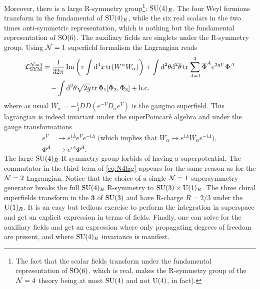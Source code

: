             Moreover, there is a large R-symmetry group\footnote{The fact that the scalar fields transform under the fundamental representation of $\text{SO}(6)$, which is real, makes the R-symmetry group of the $\mathcal{N} = 4$ theory being at most $\text{SU}(4)$ and not $\text{U}(4)$, in fact).}: $\text{SU}(4)_R$. The four Weyl fermions transform in the fundamental of $\text{SU}(4)_R$, while the six real scalars in the two times anti-symmetric representation, which is nothing but the fundamental representation of $\text{SO}(6)$. The auxiliary fields are singlets under the R-symmetry group. Using $\mathcal{N} = 1$ superfield formalism the Lagrangian reads
            \begin{align}
                \begin{split}
                    \mathcal{L}^{\mathcal{N}=4}_{\text{SYM}} &= \frac{1}{32\pi}\Im \left(\tau\int\text{d}^4x\tr(W^\alpha W_\alpha)\right)+\int\text{d}^2\theta\text{d}^2\overline{\theta}\tr\sum^3_{A=1}\overline{\Phi}^Ae^{2gV}\Phi^A\\
                    &\quad-\int\text{d}^2\theta\sqrt{2g}\tr\Phi_1[\Phi_2,\Phi_3]+\text{h.c.}
                \end{split}\label{eq:N4lag}
            \end{align}
            where as usual $W_\alpha=-\frac{1}{4}\bar{D}\bar{D}(e^{-V}D_\alpha e^V)$ is the gaugino superfield. This lagrangian is indeed invariant under the superPoincaré algebra and under the gauge transformations
            \begin{align}
                e^V &\to e^{i\bar{\Lambda}} e^V e^{-i\Lambda} \text{ (which implies that $W_\alpha \to e^{i\Lambda}W_\alpha e^{-i\Lambda}$)},\\
                \Phi^A &\to e^{i\Lambda}\Phi^A.
            \end{align}
            The large $\text{SU}(4)_R$ R-symmetry group forbids of having a superpotential. The commutator in the third term of \eqref{eq:N4lag} appears for the same reason as for the $\mathcal{N} = 2$ Lagrangian. Notice that the choice of a single $\mathcal{N} = 1$ supersymmetry generator breaks the full $\text{SU}(4)_R$ R-symmetry to $\text{SU}(3)\times \text{U}(1)_R$. The three chiral superfields transform in the $\boldsymbol{3}$ of $\text{SU}(3)$ and have R-charge $R = 2/3$ under the $\text{U}(1)_R$. It is an easy but tedious exercise to perform the integration in superspace and get an explicit expression in terms of fields. Finally, one can solve for the auxiliary fields and get an expression where only propagating degrees of freedom are present, and where $\text{SU}(4)_R$ invariance is manifest.


